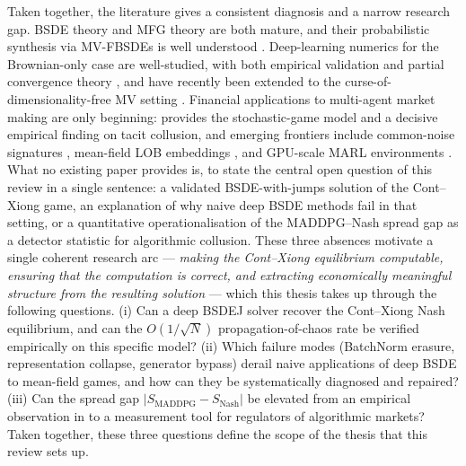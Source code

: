 Taken together, the literature gives a consistent diagnosis and a
narrow research gap.  BSDE theory and MFG theory are both mature,
and their probabilistic synthesis via MV-FBSDEs is well understood
\citep{pardoux1990, carmona2018,
buckdahn2009viscosity, chassagneux2014}.  Deep-learning
numerics for the Brownian-only case are well-studied, with both
empirical validation \citep{ehanjentzen2017, han2018,
beck2019} and partial convergence theory
\citep{carmona2019, hure2020}, and have recently
been extended to the curse-of-dimensionality-free MV setting
\citep{han2022}.  Financial applications to multi-agent
market making are only beginning: \citet{cont2024} provides
the stochastic-game model and a decisive empirical finding on tacit
collusion, and emerging frontiers include common-noise signatures
\citep{hu2025}, mean-field LOB embeddings
\citep{navarro2025}, and GPU-scale MARL environments
\citep{cheridito2025}.  What no existing paper provides is, to
state the central open question of this review in a single
sentence: a validated BSDE-with-jumps solution of the
Cont--Xiong game, an explanation of why naive deep BSDE methods
fail in that setting, or a quantitative operationalisation of
the MADDPG--Nash spread gap as a detector statistic for
algorithmic collusion.  These three absences motivate a single
coherent research arc --- \emph{making the Cont--Xiong
equilibrium computable, ensuring that the computation is
correct, and extracting economically meaningful structure from
the resulting solution} --- which this thesis takes up through
the following questions.  (i) Can a deep BSDEJ solver recover
the Cont--Xiong Nash equilibrium, and can the $O(1/\sqrt{N})$
propagation-of-chaos rate \citep{buckdahn2009limit} be verified
empirically on this specific model?  (ii) Which failure modes
(BatchNorm erasure, representation collapse, generator bypass)
derail naive applications of deep BSDE to mean-field games, and
how can they be systematically diagnosed and repaired?  (iii)
Can the spread gap $|S_{\mathrm{MADDPG}} - S_{\mathrm{Nash}}|$
be elevated from an empirical observation in \citet{cont2024}
to a measurement tool for regulators of algorithmic markets?
Taken together, these three questions define the scope of the
thesis that this review sets up.
